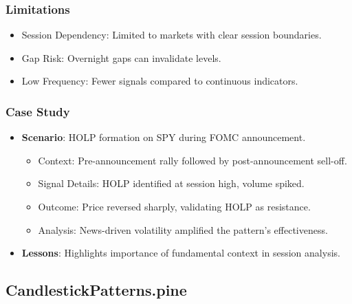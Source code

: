 \documentclass[12pt]{article}
\begin{document}
\subsubsection{Limitations}
\begin{itemize}
\item Session Dependency: Limited to markets with clear session boundaries.
\item Gap Risk: Overnight gaps can invalidate levels.
\item Low Frequency: Fewer signals compared to continuous indicators.
\end{itemize}

\subsubsection{Case Study}
\begin{itemize}
\item \textbf{Scenario}: HOLP formation on SPY during FOMC announcement.
  \begin{itemize}
  \item Context: Pre-announcement rally followed by post-announcement sell-off.
  \item Signal Details: HOLP identified at session high, volume spiked.
  \item Outcome: Price reversed sharply, validating HOLP as resistance.
  \item Analysis: News-driven volatility amplified the pattern's effectiveness.
  \end{itemize}
\item \textbf{Lessons}: Highlights importance of fundamental context in session analysis.
\end{itemize}

\subsection{CandlestickPatterns.pine}
\label{subsec:general_patterns}
\end{document}
